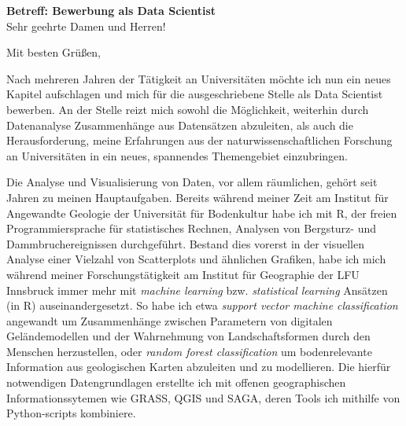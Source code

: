 \documentclass[11pt,a4paper,sans]{moderncv}        %
\begin{document}
\renewcommand*{\bibliographyhead}[1]{}

\date{19. Februar 2018}
\opening{\textbf{Betreff: Bewerbung als Data Scientist} \\[0.5cm]     Sehr geehrte Damen und Herren!}
\closing{Mit besten Gr\"{u}{\ss}en,}

\makelettertitle
\justify
\vspace{-0.5cm} %

Nach mehreren Jahren der T\"atigkeit an Universit\"aten m\"ochte ich nun ein neues Kapitel aufschlagen und mich f\"ur die ausgeschriebene Stelle als Data Scientist bewerben. An der Stelle reizt mich sowohl die M\"oglichkeit, weiterhin durch Datenanalyse Zusammenh\"ange aus Datens\"atzen abzuleiten, als auch die Herausforderung, meine Erfahrungen aus der naturwissenschaftlichen Forschung  an Universit\"aten in ein neues, spannendes Themengebiet einzubringen.

Die Analyse und Visualisierung von Daten, vor allem r\"aumlichen, geh\"ort seit Jahren zu meinen Hauptaufgaben. Bereits w\"ahrend meiner Zeit am Institut f\"ur Angewandte Geologie der Universit\"at f\"ur Bodenkultur habe ich mit R, der freien Programmiersprache f\"ur  statistisches Rechnen, Analysen von Bergsturz- und Dammbruchereignissen durchgef\"uhrt. Bestand dies vorerst in der visuellen Analyse einer Vielzahl von Scatterplots und \"ahnlichen Grafiken, habe ich mich w\"ahrend meiner Forschungst\"atigkeit am Institut f\"ur Geographie der LFU Innsbruck immer mehr mit  \emph{machine learning} bzw. \emph{statistical learning} Ans\"atzen (in R) auseinandergesetzt. So habe ich etwa \emph{support vector machine classification} angewandt um Zusammenh\"ange zwischen Parametern von digitalen Gel\"andemodellen und der Wahrnehmung von Landschaftsformen durch den Menschen herzustellen, oder \emph{random forest classification} um bodenrelevante Information aus geologischen Karten abzuleiten und zu modellieren. Die hierf\"ur notwendigen Datengrundlagen erstellte ich mit offenen geographischen Informationssytemen wie GRASS, QGIS und SAGA, deren Tools ich mithilfe von Python-scripts kombiniere. 
\end{document}
